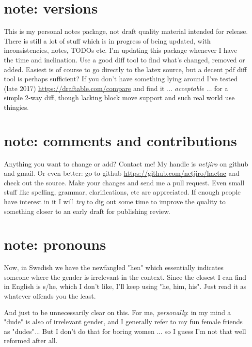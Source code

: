 \documentclass[11pt, twoside, titlepage, a4paper]{report}
\begin{document}
\newpage
\section*{note: versions}
This is my personal notes package, not draft quality material intended for release. There is still a lot of stuff which is in progress of being updated, with inconsistencies, notes, TODOs etc.
I'm updating this package whenever I have the time and inclination. Use a good diff tool to find what's changed, removed or added. Easiest is of course to go directly to the latex source, but a decent pdf diff tool is perhaps sufficient? If you don't have something lying around I've tested (late 2017) \url{https://draftable.com/compare} and find it ... \emph{acceptable} ... for a simple 2-way diff, though lacking block move support and such real world use thingies.


\section*{note: comments and contributions}
Anything you want to change or add? Contact me! My handle is \emph{netjiro} on github and gmail. Or even better: go to github \url{https://github.com/netjiro/hactac} and check out the source. Make your changes and send me a pull request. Even small stuff like spelling, grammar, clarifications, etc are appreciated. If enough people have interest in it I will \emph{try} to dig out some time to improve the quality to something closer to an early draft for publishing review.


\section*{note: pronouns}
Now, in Swedish we have the newfangled "hen" which essentially indicates someone where the gender is irrelevant in the context. Since the closest I can find in English is s/he, which I don't like, I'll keep using "he, him, his". Just read it as whatever offends you the least.

And just to be unnecessarily clear on this. For me, \emph{personally}: in my mind a "dude" is also of irrelevant gender, and I generally refer to my fun female friends as "dudes"... But I don't do that for boring women ... so I guess I'm not that well reformed after all.
\end{document}
